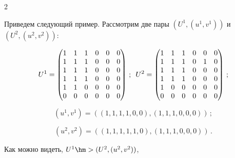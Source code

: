 \begin{multicols}{2}
\smallskip





Приведем следующий пример. Рассмотрим две пары $(U^1, (u^1,v^1))$ и~$(U^2, 


(u^2,v^2))$:


$$


U^1 = \begin{pmatrix}  


1 & 1 & 1 & 0 & 0 & 0 \\ 


1 & 1 & 1 & 0 & 0 & 0 \\ 


1 & 1 & 1 & 0 & 0 & 0\\ 


1 & 1 & 1 & 0 & 0 & 0 \\


 1 & 1 & 0 & 0 & 0 & 0 


 \\ 0 & 0 & 0 & 0 & 0 & 0 


 \end{pmatrix}\,;


 \enskip


U^2 = \begin{pmatrix} 


 1 & 1 & 1 & 0 & 0 & 0 


 \\ 1 & 1 & 1 & 0 & 1 & 0


  \\ 1 & 1 & 1 & 0 & 0 & 0\\


   1 & 1 & 1 & 0 & 0 & 0 \\ 


   1 & 0 & 0 & 0 & 0 & 0 \\


    0 & 0 & 0 & 0 & 0 & 0 


    \end{pmatrix}\,;


    $$





$$\left(u^1, v^1\right) =\left( (1,1,1,1,0,0), (1,1,1,0,0,0)\right)\,;


$$


$$\left(u^2, v^2\right) =\left( 


(1,1,1,1,1,0), (1,1,1,0,0,0)\right)\,.


$$ 


Как можно видеть, $U^1 \hm> (U^2, (u^2,v^2))$, 



\end{multicols}
